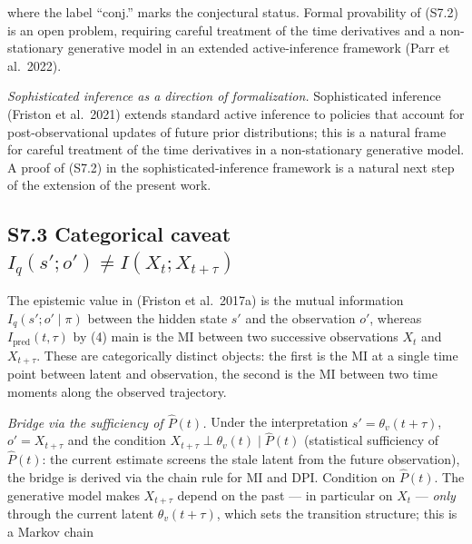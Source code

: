 \documentclass[pdflatex,sn-mathphys-ay]{sn-jnl}
\begin{document}
where the label ``conj.'' marks the conjectural status. Formal provability of (S7.2) is an open problem, requiring careful treatment of the time derivatives and a non-stationary generative model in an extended active-inference framework (Parr et al.~2022).



\emph{Sophisticated inference as a direction of formalization.} Sophisticated inference (Friston et al.~2021) extends standard active inference to policies that account for post-observational updates of future prior distributions; this is a natural frame for careful treatment of the time derivatives in a non-stationary generative model. A proof of (S7.2) in the sophisticated-inference framework is a natural next step of the extension of the present work.



\subsection*{\texorpdfstring{S7.3 Categorical caveat \(I_q(s'; o') \ne I(X_t; X_{t+\tau})\)}{S7.3 Categorical caveat I\_q(s\textquotesingle; o\textquotesingle) \textbackslash ne I(X\_t; X\_\{t+\textbackslash tau\})}}\label{s7.3-categorical-caveat-i_qs-o-ne-ix_t-x_ttau}



The epistemic value in (Friston et al.~2017a) is the mutual information \(I_q(s'; o'\mid\pi)\) between the hidden state \(s'\) and the observation \(o'\), whereas \(I_{\text{pred}}(t,\tau)\) by (4) main is the MI between two successive observations \(X_t\) and \(X_{t+\tau}\). These are categorically distinct objects: the first is the MI at a single time point between latent and observation, the second is the MI between two time moments along the observed trajectory.



\emph{Bridge via the sufficiency of \(\hat P(t)\).} Under the interpretation \(s' = \theta_v(t+\tau)\), \(o' = X_{t+\tau}\) and the condition \(X_{t+\tau} \perp \theta_v(t) \mid \hat P(t)\) (statistical sufficiency of \(\hat P(t)\): the current estimate screens the stale latent from the future observation), the bridge is derived via the chain rule for MI and DPI. Condition on \(\hat P(t)\). The generative model makes \(X_{t+\tau}\) depend on the past --- in particular on \(X_t\) --- \emph{only} through the current latent \(\theta_v(t+\tau)\), which sets the transition structure; this is a Markov chain
\end{document}
